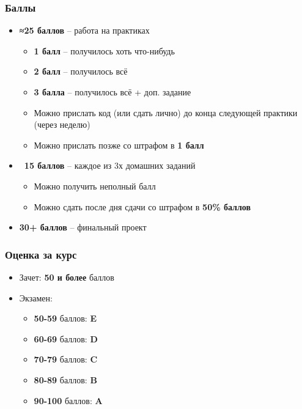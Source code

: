 \documentclass[10pt]{beamer}
\begin{document}
\begin{frame}
\frametitle{Баллы}
\begin{itemize}
\pause
\item \textbf{≈25 баллов} -- работа на практиках
\pause
\begin{itemize}
\item \textbf{1 балл} -- получилось хоть что-нибудь
\item \textbf{2 балл} -- получилось всё
\item \textbf{3 балла} -- получилось всё + доп. задание
\pause
\item Можно прислать код (или сдать лично) до конца следующей практики (через неделю)
\pause
\item Можно прислать позже со штрафом в \alert{\textbf{1 балл}}
\end{itemize}
\pause
\item \textbf{~15 баллов} -- каждое из 3х домашних заданий
\pause
\begin{itemize}
\item Можно получить неполный балл
\pause
\item Можно сдать после дня сдачи со штрафом в \alert{\textbf{50\% баллов}}
\end{itemize}
\pause
\item \textbf{30+ баллов} -- финальный проект
\end{itemize}
\end{frame}

\begin{frame}
\frametitle{Оценка за курс}
\pause
\begin{itemize}
\item Зачет: \textbf{50 и более} баллов
\pause
\item Экзамен:
\begin{itemize}
\item \textbf{50-59} баллов: \textbf{E}
\item \textbf{60-69} баллов: \textbf{D}
\item \textbf{70-79} баллов: \textbf{C}
\item \textbf{80-89} баллов: \textbf{B}
\item \textbf{90-100} баллов: \textbf{A}
\end{itemize}
\end{itemize}
\end{frame}
\end{document}
